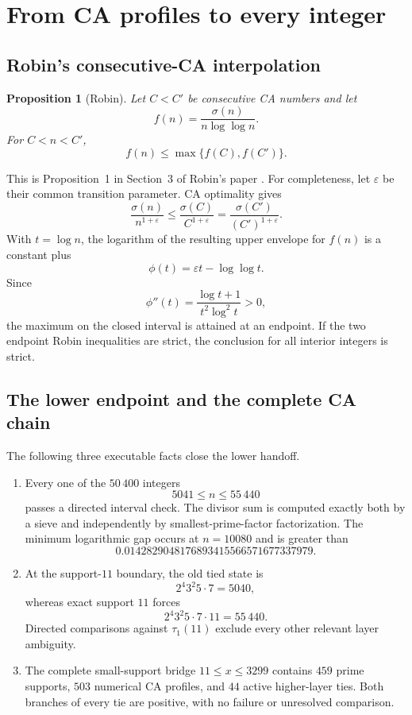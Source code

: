 \documentclass[11pt,a4paper]{article}
\numberwithin{equation}{section}
\newtheorem{proposition}[theorem]{Proposition}
\theoremstyle{definition}
\begin{document}
\section{From CA profiles to every integer}

\subsection{Robin's consecutive-CA interpolation}

\begin{proposition}[Robin]\label{prop:robin-interpolation}
Let \(C<C'\) be consecutive CA numbers and let
\[
  f(n)=\frac{\sigma(n)}{n\log\log n}.
\]
For \(C<n<C'\),
\[
  f(n)\le\max\{f(C),f(C')\}.
\]
\end{proposition}

This is Proposition~1 in Section~3 of Robin's paper
\cite[p.~192]{robin1984}.  For completeness, let \(\varepsilon\) be their
common transition parameter.  CA optimality gives
\[
  \frac{\sigma(n)}{n^{1+\varepsilon}}
  \le
  \frac{\sigma(C)}{C^{1+\varepsilon}}
  =
  \frac{\sigma(C')}{(C')^{1+\varepsilon}}.
\]
With \(t=\log n\), the logarithm of the resulting upper envelope for \(f(n)\)
is a constant plus
\[
  \phi(t)=\varepsilon t-\log\log t.
\]
Since
\[
  \phi''(t)
  =
  \frac{\log t+1}{t^2\log^2t}>0,
\]
the maximum on the closed interval is attained at an endpoint.  If the two
endpoint Robin inequalities are strict, the conclusion for all interior
integers is strict.

\subsection{The lower endpoint and the complete CA chain}

The following three executable facts close the lower handoff.

\begin{enumerate}
  \item Every one of the \(50\,400\) integers
        \[
          5041\le n\le55\,440
        \]
        passes a directed interval check.  The divisor sum is computed
        exactly both by a sieve and independently by smallest-prime-factor
        factorization.  The minimum logarithmic gap occurs at \(n=10080\) and
        is greater than
        \[
          0.0142829048176893415566571677337979.
        \]
  \item At the support-\(11\) boundary, the old tied state is
        \[
          2^4 3^2 5\cdot7=5040,
        \]
        whereas exact support \(11\) forces
        \[
          2^4 3^2 5\cdot7\cdot11=55\,440.
        \]
        Directed comparisons against \(\tau_1(11)\) exclude every other
        relevant layer ambiguity.
  \item The complete small-support bridge \(11\le x\le3299\) contains
        \(459\) prime supports, \(503\) numerical CA profiles, and \(44\)
        active higher-layer ties.  Both branches of every tie are positive,
        with no failure or unresolved comparison.
\end{enumerate}
\end{document}
